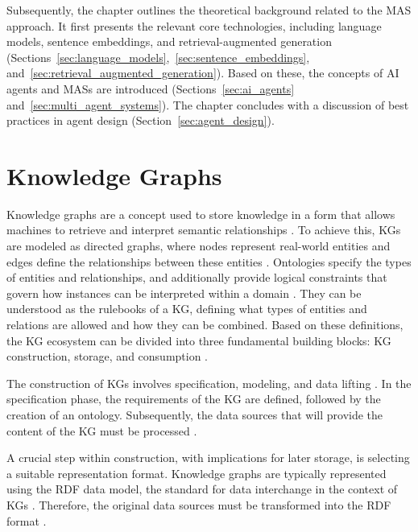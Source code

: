\documentclass[a4paper,oneside,bibliography=totoc]{scrbook}
\begin{document}
Subsequently, the chapter outlines the theoretical background related to the \ac{MAS} approach. It first presents the relevant core technologies, including language models, sentence embeddings, and retrieval-augmented generation (Sections~\ref{sec:language_models},~\ref{sec:sentence_embeddings}, and~\ref{sec:retrieval_augmented_generation}). Based on these, the concepts of \ac{AI} agents and \acp{MAS} are introduced (Sections~\ref{sec:ai_agents} and~\ref{sec:multi_agent_systems}). The chapter concludes with a discussion of best practices in agent design (Section~\ref{sec:agent_design}).


\section{Knowledge Graphs}
\label{sec:knowledge_graphs}

Knowledge graphs are a concept used to store knowledge in a form that allows machines to retrieve and interpret semantic relationships \cite{GomezPerez2017}. To achieve this, \acp{KG} are modeled as directed graphs, where nodes represent real-world entities and edges define the relationships between these entities \cite{Paulheim2016}. Ontologies specify the types of entities and relationships, and additionally provide logical constraints that govern how instances can be interpreted within a domain \cite{GomezPerez2017,Paulheim2016}. They can be understood as the rulebooks of a \ac{KG}, defining what types of entities and relations are allowed and how they can be combined. Based on these definitions, the \ac{KG} ecosystem can be divided into three fundamental building blocks: \ac{KG} construction, storage, and consumption \cite{GomezPerez2017}.

The construction of \acp{KG} involves specification, modeling, and data lifting \cite{VillazonTerrazas2017}. In the specification phase, the requirements of the \ac{KG} are defined, followed by the creation of an ontology. Subsequently, the data sources that will provide the content of the \ac{KG} must be processed \cite{VillazonTerrazas2017}.

A crucial step within construction, with implications for later storage, is selecting a suitable representation format. Knowledge graphs are typically represented using the \ac{RDF} data model, the standard for data interchange in the context of \acp{KG} \cite{VillazonTerrazas2017a}. Therefore, the original data sources must be transformed into the \ac{RDF} format \cite{VillazonTerrazas2017a}.
\end{document}
